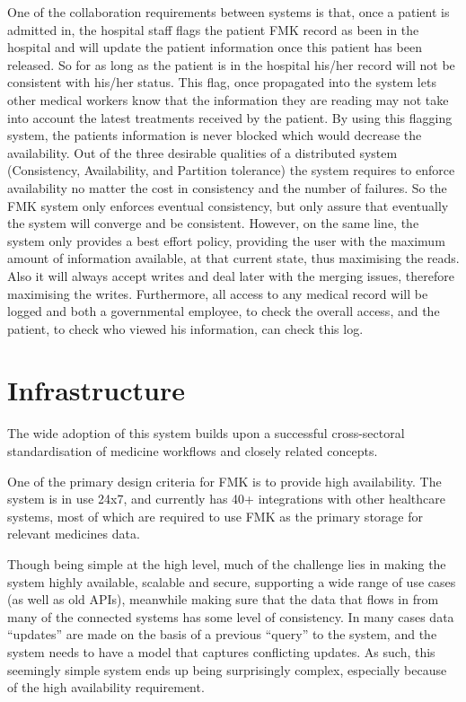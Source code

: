 \documentclass[english]{article}
\begin{document}
One of the collaboration requirements between systems is that, once a patient is admitted in, the hospital staff flags the patient FMK record as been in the hospital and will update the patient information once this patient has been released. So for as long as the patient is in the hospital his/her record will not be consistent with his/her status. This flag, once propagated into the system lets other medical workers know that the information they are reading may not take into account the latest treatments received by the patient. By using this flagging system, the patients information is never blocked which would decrease the availability. Out of the three desirable qualities of a distributed system (Consistency, Availability, and Partition tolerance) the system requires to enforce availability no matter the cost in consistency and the number of failures. So the FMK system only enforces eventual consistency, but only assure that eventually the system will converge and be consistent. However, on the same line, the system only provides a best effort policy, providing the user with the maximum amount of information available, at that current state, thus maximising the reads. Also it will always accept writes and deal later with the merging issues, therefore maximising the writes. Furthermore, all access to any medical record will be logged and both a governmental employee, to check the overall access, and the patient, to check who viewed his information, can check this log. 


\section{Infrastructure}

The wide adoption of this system builds upon a successful cross-sectoral standardisation of medicine workflows and closely related concepts.

One of the primary design criteria for FMK is to provide high availability. The system is in use 24x7, and currently has 40+ integrations with
other healthcare systems, most of which are required to use FMK as the primary storage for relevant medicines data.

Though being simple at the high level, much of the challenge lies in making the system highly available, scalable and secure, supporting a wide range of use cases (as well as old APIs), meanwhile making sure that the data that flows in from many of the connected systems has some level of consistency. In many cases data ``updates'' are made on the basis of a previous ``query'' to the system, and the system needs to have a model that captures conflicting updates. As such, this seemingly simple system ends up being surprisingly complex, especially because of the high availability requirement.
\end{document}
